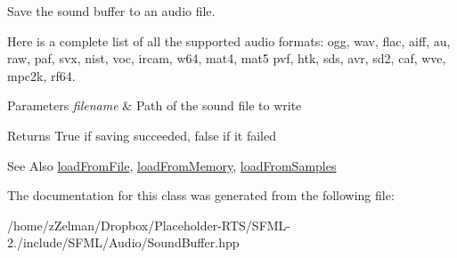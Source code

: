 Save the sound buffer to an audio file. 

Here is a complete list of all the supported audio formats\-: ogg, wav, flac, aiff, au, raw, paf, svx, nist, voc, ircam, w64, mat4, mat5 pvf, htk, sds, avr, sd2, caf, wve, mpc2k, rf64.


\begin{DoxyParams}{Parameters}
{\em filename} & Path of the sound file to write\\
\hline
\end{DoxyParams}
\begin{DoxyReturn}{Returns}
True if saving succeeded, false if it failed
\end{DoxyReturn}
\begin{DoxySeeAlso}{See Also}
\hyperlink{classsf_1_1SoundBuffer_a2be6a8025c97eb622a7dff6cf2594394}{load\-From\-File}, \hyperlink{classsf_1_1SoundBuffer_af8cfa5599739a7edae69c5cba273d33f}{load\-From\-Memory}, \hyperlink{classsf_1_1SoundBuffer_a63da986e144b578135edd48e51c565e8}{load\-From\-Samples} 
\end{DoxySeeAlso}


The documentation for this class was generated from the following file\-:\begin{DoxyCompactItemize}
\item 
/home/z\-Zelman/\-Dropbox/\-Placeholder-\/\-R\-T\-S/\-S\-F\-M\-L-\/2./include/\-S\-F\-M\-L/\-Audio/Sound\-Buffer.\-hpp\end{DoxyCompactItemize}
